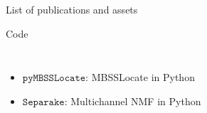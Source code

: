 \begin{frame}{List of publications and assets}
\begin{block}{Code}
\begin{columns}[T,onlytextwidth]
            \begin{itemize}\small
                \item $\mathtt{pyMBSSLocate}$: MBSSLocate in Python
                \item $\mathtt{Separake}$: Multichannel NMF in Python
            \end{itemize}

            \pause
            \begin{center}
            \end{center}

        \end{columns}
    \end{block}

\end{frame}